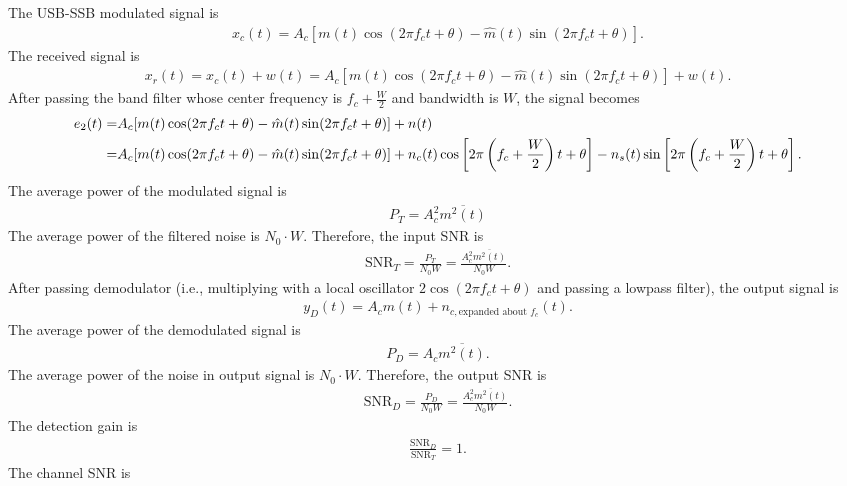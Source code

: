 \documentclass{assignment}
\begin{document}
\begin{sol}
    The USB-SSB modulated signal is
    \begin{align}
        x_c(t)=A_c[m(t)\cos(2\pi f_ct+\theta)-\hat{m}(t)\sin(2\pi f_ct+\theta)].
    \end{align}
    The received signal is
    \begin{align}
        x_r(t)=x_c(t)+w(t)=A_c[m(t)\cos(2\pi f_ct+\theta)-\hat{m}(t)\sin(2\pi f_ct+\theta)]+w(t).
    \end{align}
    After passing the band filter whose center frequency is $f_c+\frac{W}{2}$ and bandwidth is $W$, the signal becomes
    \begin{align}
        \notag e_2(t)=&A_c[m(t)\cos(2\pi f_ct+\theta)-\hat{m}(t)\sin(2\pi f_ct+\theta)]+n(t)\\
        =&A_c[m(t)\cos(2\pi f_ct+\theta)-\hat{m}(t)\sin(2\pi f_ct+\theta)]+n_c(t)\cos\left[2\pi\left(f_c+\frac{W}{2}\right)t+\theta\right]-n_s(t)\sin\left[2\pi\left(f_c+\frac{W}{2}\right)t+\theta\right].
    \end{align}
    The average power of the modulated signal is
    \begin{align}
        P_T=A_c^2\overline{m^2(t)}
    \end{align}
    The average power of the filtered noise is $N_0\cdot W$.
    Therefore, the input SNR is
    \begin{align}
        \text{SNR}_T=\frac{P_T}{N_0W}=\frac{A_c^2\overline{m^2(t)}}{N_0W}.
    \end{align}
    After passing demodulator (i.e., multiplying with a local oscillator $2\cos(2\pi f_ct+\theta)$ and passing a lowpass filter), the output signal is
    \begin{align}
        y_D(t)=A_cm(t)+n_{c,\text{expanded about }f_c}(t).
    \end{align}
    The average power of the demodulated signal is
    \begin{align}
        P_D=A_c\overline{m^2(t)}.
    \end{align}
    The average power of the noise in output signal is $N_0\cdot W$.
    Therefore, the output SNR is
    \begin{align}
        \text{SNR}_D=\frac{P_D}{N_0W}=\frac{A_c^2\overline{m^2(t)}}{N_0W}.
    \end{align}
    The detection gain is
    \begin{align}
        \frac{\text{SNR}_D}{\text{SNR}_T}=1.
    \end{align}
    The channel SNR is
    \begin{align}

\end{align}
\end{sol}
\end{document}
